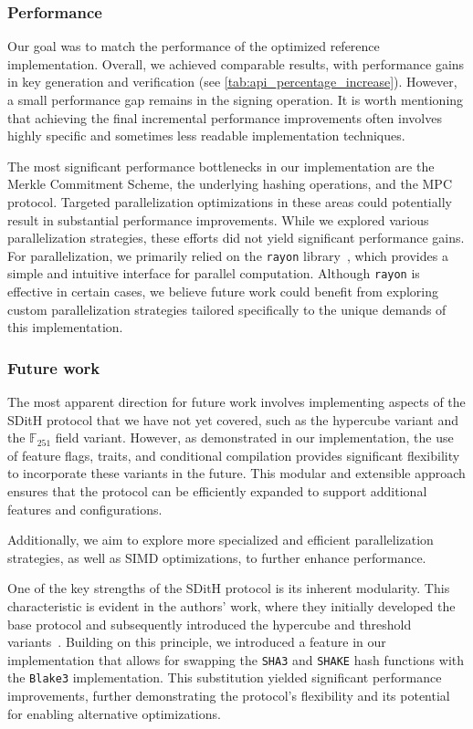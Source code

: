 \documentclass[11pt]{report}
\theoremstyle{definition}
\theoremstyle{plain}
\begin{document}
\subsubsection{Performance}

Our goal was to match the performance of the optimized reference implementation. Overall, we achieved comparable results, with performance gains in key generation and verification (see \autoref{tab:api_percentage_increase}). However, a small performance gap remains in the signing operation. It is worth mentioning that achieving the final incremental performance improvements often involves highly specific and sometimes less readable implementation techniques.

The most significant performance bottlenecks in our implementation are the Merkle Commitment Scheme, the underlying hashing operations, and the MPC protocol. Targeted parallelization optimizations in these areas could potentially result in substantial performance improvements. While we explored various parallelization strategies, these efforts did not yield significant performance gains. For parallelization, we primarily relied on the \texttt{rayon} library~\cite{rayon}, which provides a simple and intuitive interface for parallel computation. Although \texttt{rayon} is effective in certain cases, we believe future work could benefit from exploring custom parallelization strategies tailored specifically to the unique demands of this implementation.

\subsubsection{Future work}

The most apparent direction for future work involves implementing aspects of the SDitH protocol that we have not yet covered, such as the hypercube variant and the $\mathbb{F}_{251}$ field variant. However, as demonstrated in our implementation, the use of feature flags, traits, and conditional compilation provides significant flexibility to incorporate these variants in the future. This modular and extensible approach ensures that the protocol can be efficiently expanded to support additional features and configurations.

Additionally, we aim to explore more specialized and efficient parallelization strategies, as well as SIMD optimizations, to further enhance performance.

One of the key strengths of the SDitH protocol is its inherent modularity. This characteristic is evident in the authors' work, where they initially developed the base protocol and subsequently introduced the hypercube and threshold variants~\cite{feneuil2023threshold,aguilar2023return}. Building on this principle, we introduced a feature in our implementation that allows for swapping the \texttt{SHA3} and \texttt{SHAKE} hash functions with the \texttt{Blake3} implementation. This substitution yielded significant performance improvements, further demonstrating the protocol's flexibility and its potential for enabling alternative optimizations.
\end{document}
